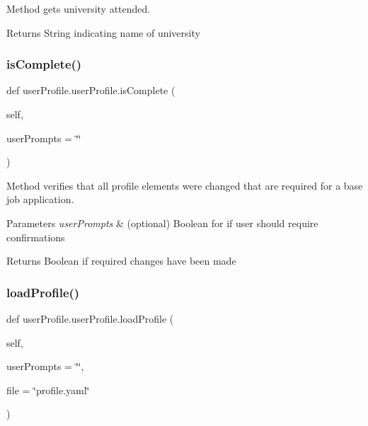Method gets university attended. 

\begin{DoxyReturn}{Returns}
String indicating name of university 
\end{DoxyReturn}
\mbox{\label{classuserProfile_1_1userProfile_a805c57945934e5b839077ee8d8edfe5d}} 
\subsubsection{\texorpdfstring{is\+Complete()}{isComplete()}}
{\footnotesize\ttfamily def user\+Profile.\+user\+Profile.\+is\+Complete (\begin{DoxyParamCaption}\item[{}]{self,  }\item[{}]{user\+Prompts = {\ttfamily \char`\"{}\char`\"{}} }\end{DoxyParamCaption})}



Method verifies that all profile elements were changed that are required for a base job application. 


\begin{DoxyParams}{Parameters}
{\em user\+Prompts} & (optional) Boolean for if user should require confirmations \\
\hline
\end{DoxyParams}
\begin{DoxyReturn}{Returns}
Boolean if required changes have been made 
\end{DoxyReturn}
\mbox{\label{classuserProfile_1_1userProfile_a7243a67eaec172d035828f95779b9534}} 
\subsubsection{\texorpdfstring{load\+Profile()}{loadProfile()}}
{\footnotesize\ttfamily def user\+Profile.\+user\+Profile.\+load\+Profile (\begin{DoxyParamCaption}\item[{}]{self,  }\item[{}]{user\+Prompts = {\ttfamily \char`\"{}\char`\"{}},  }\item[{}]{file = {\ttfamily \char`\"{}profile.yaml\char`\"{}} }\end{DoxyParamCaption})}



